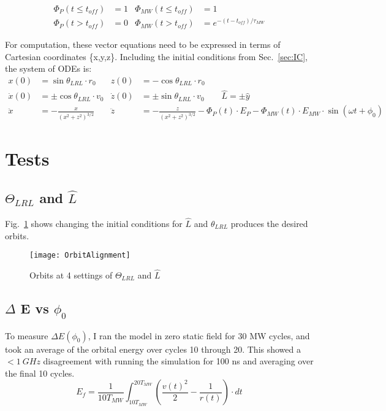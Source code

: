 \documentclass[aps,pra,preprint,groupedaddress]{revtex4-1}
\begin{document}
\begin{align*}
\Phi_P(t \leq t_{off}) & = 1 & \Phi_{MW}(t \leq t_{off}) & = 1 \\
\Phi_P(t > t_{off}) & = 0 & \Phi_{MW}(t > t_{off}) & = e^{-(t-t_{off})/\tau_{MW}}
\end{align*}

For computation, these vector equations need to be expressed in terms of Cartesian coordinates \{x,y,z\}. Including the initial conditions from Sec.~\ref{sec:IC}, the system of ODEs is:
\begin{align*}
x(0) & = \sin{\theta_{LRL}} \cdot r_0 & z(0) & = -\cos{\theta_{LRL}} \cdot r_0 \\
\dot{x}(0) & = \pm \cos{\theta_{LRL}} \cdot v_0 & \dot{z}(0) & = \pm \sin{\theta_{LRL}} \cdot v_0 \quad \quad \hat{L} = \pm \hat{y} \\
\ddot{x} & = -\frac{x}{(x^2 + z^2)^{3/2}} & \ddot{z} & = -\frac{z}{(x^2 + z^2)^{3/2}} - \Phi_P(t) \cdot E_P - \Phi_{MW}(t) \cdot E_{MW} \cdot \sin{(\omega t + \phi_0)}
\end{align*}

\section{\label{sec:Tests} Tests}

\subsection{\label{sec:ThL} $\Theta_{LRL}$ and $\hat{L}$}

Fig.~\ref{fig:ThL} shows changing the initial conditions for $\hat{L}$ and $\theta_{LRL}$ produces the desired orbits.

\begin{figure}
	\texttt{[image: OrbitAlignment]}
	\caption{Orbits at 4 settings of $\Theta_{LRL}$ and $\hat{L}$}
	\label{fig:ThL}
\end{figure}

\subsection{\label{sec:EvP} $\Delta$ E vs $\phi_0$}

To measure $\Delta E(\phi_0)$, I ran the model in zero static field for 30 MW cycles, and took an average of the orbital energy over cycles 10 through 20. This showed a $<1 ~ GHz$ disagreement with running the simulation for 100 ns and averaging over the final 10 cycles.
\begin{equation*}
E_f = \frac{1}{10T_{MW}} \int_{10T_{MW}}^{20T_{MW}} \left(\frac{v(t)^2}{2} - \frac{1}{r(t)}\right) \cdot dt
\end{equation*}
\end{document}
